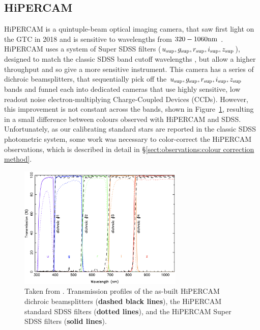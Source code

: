 \subsection{HiPERCAM}
\label{sect:observations:hipercam}

HiPERCAM is a quintuple-beam optical imaging camera, that saw first light on the GTC in 2018 and is sensitive to wavelengths from $320 - 1060 \rm nm$ \citep{dhillon2021}.
HiPERCAM uses a system of Super SDSS filters ($u_{\rm sup}, g_{\rm sup}, r_{\rm sup}, i_{\rm sup}, z_{\rm sup}$), designed to match the classic SDSS band cutoff wavelengths \citep{fukugita1996}, but allow a higher throughput and so give a more sensitive instrument.
This camera has a series of dichroic beamsplitters, that sequentially pick off the $u_{\rm sup}, g_{\rm sup}, r_{\rm sup}, i_{\rm sup}, z_{\rm sup}$ bands and funnel each into dedicated cameras that use highly sensitive, low readout noise electron-multiplying Charge-Coupled Devices (CCDs).
However, this improvement is not constant across the bands, shown in Figure~\ref{fig:observations:superSDSS throughput comparison}, resulting in a small difference between colours observed with HiPERCAM and SDSS.
Unfortunately, as our calibrating standard stars are reported in the classic SDSS photometric system, some work was necessary to color-correct the HiPERCAM observations, which is described in detail in \S\ref{sect:observations:colour correction method}.
\begin{figure}
    \centering
    \includegraphics[width=0.7\textwidth]{figures/observations/plot_dichs_supersdss_asbuilt_v3.png}
    \caption{Taken from \citet{dhillon2021}. Transmission profiles of the as-built HiPERCAM dichroic beamsplitters ({\bf dashed black lines}), the HiPERCAM standard SDSS filters ({\bf dotted lines}), and the HiPERCAM Super SDSS filters ({\bf solid lines}).}
    \label{fig:observations:superSDSS throughput comparison}
\end{figure}

